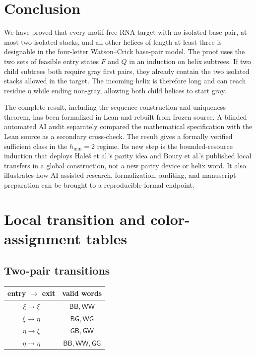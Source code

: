 \documentclass[11pt]{article}
\newcommand{\Bcol}{\mathsf{B}}
\newcommand{\Wcol}{\mathsf{W}}
\newcommand{\Gray}{\mathsf{G}}
\begin{document}
\section{Conclusion}
\label{sec:conclusion}

We have proved that every motif-free RNA target with no isolated base pair, at most two isolated stacks, and all other helices of length at least three is designable in the four-letter Watson--Crick base-pair model.  The proof uses the two sets of feasible entry states $F$ and $Q$ in an induction on helix subtrees.  If two child subtrees both require gray first pairs, they already contain the two isolated stacks allowed in the target.  The incoming helix is therefore long and can reach residue $\eta$ while ending non-gray, allowing both child helices to start gray.

The complete result, including the sequence construction and uniqueness theorem, has been formalized in Lean and rebuilt from frozen source.  A blinded automated AI audit separately compared the mathematical specification with the Lean source as a secondary cross-check.  The result gives a formally verified sufficient class in the $h_{\min}=2$ regime.  Its new step is the bounded-resource induction that deploys Hale\v{s} et al.'s parity idea and Boury et al.'s published local transfers in a global construction, not a new parity device or helix word.  It also illustrates how AI-assisted research, formalization, auditing, and manuscript preparation can be brought to a reproducible formal endpoint.

\appendix

\section{Local transition and color-assignment tables}
\label{app:tables}

\subsection{Two-pair transitions}

\begin{center}
\begin{tabular}{cc}
\toprule
entry $\to$ exit & valid words \\
\midrule
$\xi\to\xi$ & $\Bcol\Bcol,\Wcol\Wcol$ \\
$\xi\to\eta$ & $\Bcol\Gray,\Wcol\Gray$ \\
$\eta\to\xi$ & $\Gray\Bcol,\Gray\Wcol$ \\
$\eta\to\eta$ & $\Bcol\Bcol,\Wcol\Wcol,\Gray\Gray$ \\
\bottomrule
\end{tabular}
\end{center}
\end{document}
